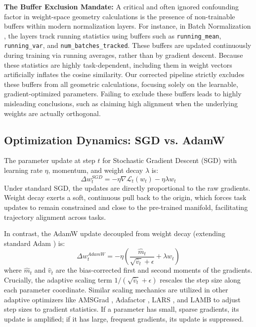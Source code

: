 \documentclass{article}
\theoremstyle{plain}
\theoremstyle{definition}
\theoremstyle{remark}
\begin{document}
\textbf{The Buffer Exclusion Mandate:}
A critical and often ignored confounding factor in weight-space geometry calculations is the presence of non-trainable buffers within modern normalization layers. For instance, in Batch Normalization \cite{ioffe2015batch}, the layers track running statistics using buffers such as \texttt{running\_mean}, \texttt{running\_var}, and \texttt{num\_batches\_tracked}. These buffers are updated continuously during training via running averages, rather than by gradient descent. Because these statistics are highly task-dependent, including them in weight vectors artificially inflates the cosine similarity. Our corrected pipeline strictly excludes these buffers from all geometric calculations, focusing solely on the learnable, gradient-optimized parameters. Failing to exclude these buffers leads to highly misleading conclusions, such as claiming high alignment when the underlying weights are actually orthogonal.

\subsection{Optimization Dynamics: SGD vs. AdamW}
The parameter update at step $t$ for Stochastic Gradient Descent (SGD) with learning rate $\eta$, momentum, and weight decay $\lambda$ \cite{sutskever2013importance, loshchilov2016sgdr} is:
\begin{equation}
    \Delta w_t^{SGD} = -\eta \nabla \mathcal{L}_t(w_t) - \eta \lambda w_t
\end{equation}
Under standard SGD, the updates are directly proportional to the raw gradients. Weight decay exerts a soft, continuous pull back to the origin, which forces task updates to remain constrained and close to the pre-trained manifold, facilitating trajectory alignment across tasks.

In contrast, the AdamW update decoupled from weight decay \cite{loshchilov2018decoupled} (extending standard Adam \cite{kingma2014adam}) is:
\begin{equation}
    \Delta w_t^{AdamW} = -\eta \left( \frac{\hat{m}_t}{\sqrt{\hat{v}_t} + \epsilon} + \lambda w_t \right)
\end{equation}
where $\hat{m}_t$ and $\hat{v}_t$ are the bias-corrected first and second moments of the gradients. Crucially, the adaptive scaling term $1/(\sqrt{\hat{v}_t} + \epsilon)$ rescales the step size along each parameter coordinate. Similar scaling mechanics are utilized in other adaptive optimizers like AMSGrad \cite{reddi2019convergence}, Adafactor \cite{shazeer2018adafactor}, LARS \cite{you2017large}, and LAMB \cite{you2019large} to adjust step sizes to gradient statistics. If a parameter has small, sparse gradients, its update is amplified; if it has large, frequent gradients, its update is suppressed. 
\end{document}
